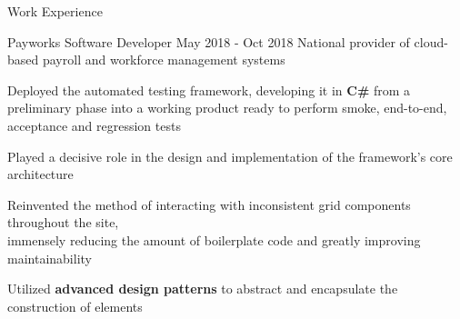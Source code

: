 \documentclass{resume} %
\begin{document}
\begin{rSection}{Work Experience}
    \begin{workexperience}
        {Payworks}
        {Software Developer}
        {May 2018 - Oct 2018}
        {National provider of cloud-based payroll and workforce management systems}
        {
            \item Deployed the automated testing framework, developing it in \textbf{C\#} from a preliminary phase into a working product ready to perform smoke, end-to-end, acceptance and regression tests
            \item Played a decisive role in the design and implementation of the framework's core architecture
            \item Reinvented the method of interacting with inconsistent grid components throughout the site, \\immensely reducing the amount of boilerplate code and greatly improving maintainability
            \item Utilized \textbf{advanced design patterns} to abstract and encapsulate the construction of elements
        }
    \end{workexperience}

    \vspace{1em}

\end{rSection}


\pagebreak
\end{document}
